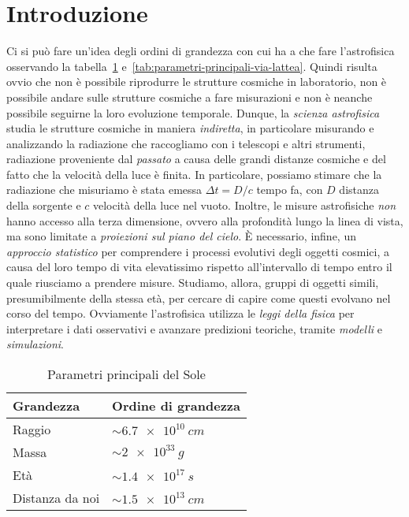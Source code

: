 \section{Introduzione}\label{sec:introduzione}
Ci si può fare un'idea degli ordini di grandezza con cui ha a che fare l'astrofisica osservando la tabella~\ref{tab:parametri-principali-sole} e~\ref{tab:parametri-principali-via-lattea}. Quindi risulta ovvio che non è possibile riprodurre le strutture cosmiche in laboratorio, non è possibile andare sulle strutture cosmiche a fare misurazioni e non è neanche possibile seguirne la loro evoluzione temporale. Dunque, la \emph{scienza astrofisica} studia le strutture cosmiche in maniera \emph{indiretta}, in particolare misurando e analizzando la radiazione che raccogliamo con i telescopi e altri strumenti, radiazione proveniente dal \emph{passato} a causa delle grandi distanze cosmiche e del fatto che la velocità della luce è finita. In particolare, possiamo stimare che la radiazione che misuriamo è stata emessa $\Delta t = D / c$ tempo fa, con $D$ distanza della sorgente e $c$ velocità della luce nel vuoto. Inoltre, le misure astrofisiche \emph{non} hanno accesso alla terza dimensione, ovvero alla profondità lungo la linea di vista, ma sono limitate a \emph{proiezioni sul piano del cielo}. È necessario, infine, un \emph{approccio statistico} per comprendere i processi evolutivi degli oggetti cosmici, a causa del loro tempo di vita elevatissimo rispetto all'intervallo di tempo entro il quale riusciamo a prendere misure. Studiamo, allora, gruppi di oggetti simili, presumibilmente della stessa età, per cercare di capire come questi evolvano nel corso del tempo. Ovviamente l'astrofisica utilizza le \emph{leggi della fisica} per interpretare i dati osservativi e avanzare predizioni teoriche, tramite \emph{modelli} e \emph{simulazioni}. 

\begin{table}
\caption{Parametri principali del Sole}
\label{tab:parametri-principali-sole}
\centering
\begin{tabular}{ll}
\toprule
Grandezza & Ordine di grandezza \\
\midrule
Raggio          & $\sim \SI{6.7e10}{cm}$ \\
Massa           & $\sim \SI{2e33}{g}$    \\
Età             & $\sim \SI{1.4e17}{s}$  \\
Distanza da noi & $\sim \SI{1.5e13}{cm}$  \\
\bottomrule
\end{tabular}
\end{table}

